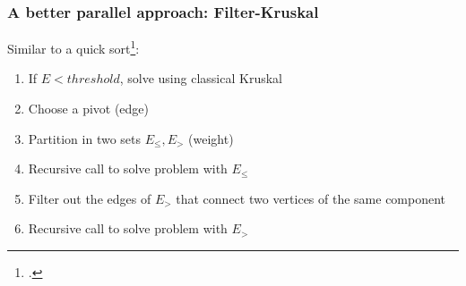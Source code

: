 \documentclass{beamer}
\begin{document}
\begin{frame}
    \frametitle{A better parallel approach: Filter-Kruskal}
    Similar to a quick sort\footcite{Osipov:2009:FMS:2791220.2791225}:
    \begin{enumerate}
        \item If $E < threshold$, solve using classical Kruskal
        \item Choose a pivot (edge)
        \item Partition in two sets $E_{\leq}, E_>$ (weight)
        \item Recursive call to solve problem with $E_{\leq}$
        \item Filter out the edges of $E_>$ that connect two vertices of the same component
        \item Recursive call to solve problem with $E_>$
    \end{enumerate}


\end{frame}
\end{document}
